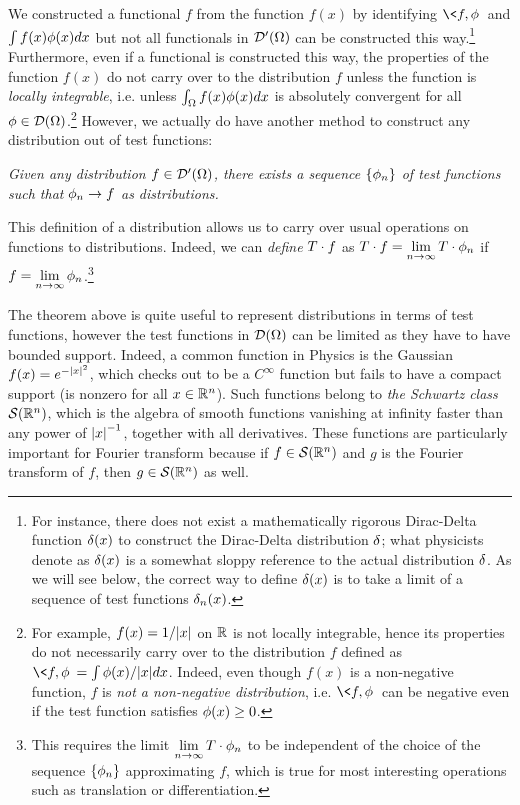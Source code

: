 We constructed a functional $f$ from the function $f(x)$ by identifying $\<f,\f\>$ and $\int f(x)\f(x)dx$ but not all functionals in $\cD'(\O)$ can be constructed this way.\footnote{For instance, there does not exist a mathematically rigorous Dirac-Delta function $\de(x)$ to construct the Dirac-Delta distribution $\de$; what physicists denote as $\de(x)$ is a somewhat sloppy reference to the actual distribution $\de$. As we will see below, the correct way to define $\de(x)$ is to take a limit of a sequence of test functions $\de_n(x)$.} Furthermore, even if a functional is constructed this way, the properties of the function $f(x)$ do not carry over to the distribution $f$ unless the function is \emph{locally integrable}, i.e. unless $\int_\O f(x)\f(x)dx$ is absolutely convergent for all $\f\in\cD(\O)$.\footnote{For example, $f(x)=1/\abs{x}$ on $\R$ is not locally integrable, hence its properties do not necessarily carry over to the distribution $f$ defined as $\<f,\f\>=\int \f(x)/\abs{x} dx$. Indeed, even though $f(x)$ is a non-negative function, $f$ is \emph{not a non-negative distribution}, i.e. $\<f,\f\>$ can be negative even if the test function satisfies $\f(x)\ge 0$.} However, we actually do have another method to construct any distribution out of test functions:
\begin{center}
	\itshape Given any distribution $f\in\cD'(\O)$, there exists a sequence $\{\f_n\}$ of test functions such that $\f_n\rightarrow f$ as distributions.
\end{center} 
This definition of a distribution allows us to carry over usual operations on functions to distributions. Indeed, we can \emph{define} $T\.f$ as $T\.f=\lim\limits_{n\rightarrow\infty}T\.\f_n$ if $f=\lim\limits_{n\rightarrow\infty}\f_n$.\footnote{This requires the limit $\lim\limits_{n\rightarrow\infty}T\.\f_n$ to be independent of the choice of the sequence $\{\f_n\}$  approximating $f$, which is true for most interesting operations such as translation or differentiation.}

The theorem above is quite useful to represent distributions in terms of test functions, however the test functions in $\cD(\O)$ can be limited as they have to have bounded support. Indeed, a common function in Physics is the Gaussian $f(x)=e^{-\abs{x}^2}$, which checks out to be a $C^\infty$ function but fails to have a compact support (is nonzero for all $x\in\R^n$). Such functions belong to \emph{the Schwartz class} $\cS(\R^n)$, which is the algebra of smooth functions vanishing at infinity faster than any power of $\abs{x}^{-1}$, together with all derivatives. These functions are particularly important for Fourier transform because if $f\in\cS(\R^n)$ and $g$ is the Fourier transform of $f$, then $g\in\cS(\R^n)$ as well.


